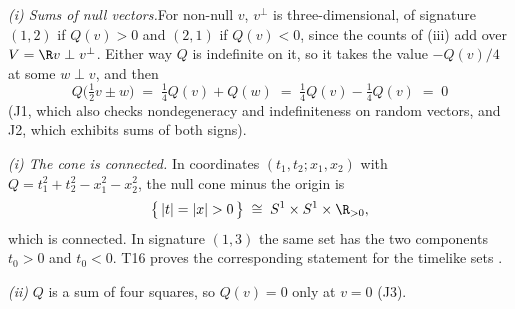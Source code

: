 \textit{(i) Sums of null vectors.}\enspace For non-null $v$, $v^{\perp}$ is three-dimensional, of signature $(1,2)$ if $Q(v) > 0$ and $(2,1)$ if $Q(v) < 0$, since the counts of (iii) add over $V = \R v \perp v^{\perp}$. Either way $Q$ is indefinite on it, so it takes the value $-Q(v)/4$ at some $w \perp v$, and then
\[
Q\bigl(\tfrac{1}{2}v \pm w\bigr) \;=\; \tfrac{1}{4}Q(v) + Q(w) \;=\; \tfrac{1}{4}Q(v) - \tfrac{1}{4}Q(v) \;=\; 0
\]
(J1, which also checks nondegeneracy and indefiniteness on random vectors, and J2, which exhibits sums of both signs).



\emph{(i) The cone is connected.}  In coordinates $(t_{1}, t_{2}; x_{1}, x_{2})$ with $Q = t_{1}^{2} + t_{2}^{2} - x_{1}^{2} - x_{2}^{2}$, the null cone minus the origin is
\[
\bigl\{\, |t| = |x| > 0 \,\bigr\} \;\cong\; S^{1} \times S^{1} \times \R_{>0},
\]
which is connected. In signature $(1,3)$ the same set has the two components $t_{0} > 0$ and $t_{0} < 0$. T16 proves the corresponding statement for the timelike sets \cite[Lem.~4.4]{ButlerT16}.



\emph{(ii)}  $Q$ is a sum of four squares, so $Q(v) = 0$ only at $v = 0$ (J3).

